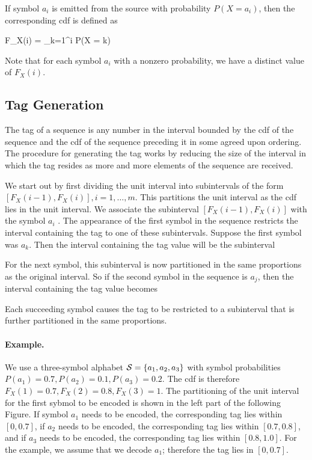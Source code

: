 If symbol $a_i$ is emitted from the source with probability $P(X = a_i)$, then the corresponding cdf is defined as

\bee
F_X(i) = \sum_{k=1}^i P(X = k)
\eee

Note that for each symbol $a_i$ with a nonzero probability, we have a distinct value of $F_X(i)$.

\subsection{Tag Generation}

The tag of a sequence is any number in the interval bounded by the cdf of the sequence and the cdf of the sequence preceding it in some agreed upon ordering. The procedure for generating the tag works by reducing the size of the interval in which the tag resides as more and more elements of the sequence are received.

We start out by first dividing the unit interval into subintervals of the form $[F_X(i - 1), F_X(i)], i = 1, \ldots, m$. This partitions the unit interval as the cdf lies in the unit interval. We associate the subinterval $[F_X(i - 1), F_X (i)]$ with the symbol $a_i$ . The appearance of the first symbol in the sequence restricts the interval containing the tag to one of these subintervals. Suppose the first symbol was $a_k$. Then the interval containing the tag value will be the subinterval 

\bee
\left[ F_X(k-1), F_X(k) \right]
\eee

For the next symbol, this subinterval is now partitioned in the same proportions as the original interval. So if the second symbol in the sequence is $a_j$, then the interval containing the tag value becomes 

\bee
{}
\eee

Each succeeding symbol causes the tag to be restricted to a subinterval that is further partitioned in the same proportions.

\paragraph{Example.} We use a three-symbol alphabet $\mathcal{S} = \{a_1, a_2, a_3\}$ with symbol probabilities $P(a_1) = 0.7, P(a_2) = 0.1, P(a_3) = 0.2$. The cdf is therefore $F_X(1) = 0.7, F_X(2) = 0.8, F_X(3) = 1$. The partitioning of the unit interval for the first sybmol to be encoded is shown in the left part of the following Figure. If symbol $a_1$ needs to be encoded, the corresponding tag lies within $[0, 0.7]$, if $a_2$ needs to be encoded, the corresponding tag lies within $[0.7, 0.8]$, and if $a_3$ needs to be encoded, the corresponding tag lies within $[0.8, 1.0]$. For the example, we assume that we decode $a_1$; therefore the tag lies in $[0, 0.7]$.

